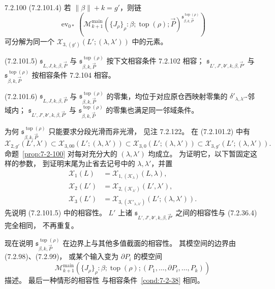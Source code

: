 \begin{proposition}{7.2.100}
\noindent\textup{(7.2.101.4)}\quad
若 $\|\beta\|+k=g'$，则链
\[
\operatorname{ev}_{0*}\left(
\mathcal M^{\mathrm{main}}_{k+1}
(\{J_\rho\}_\rho:\beta;
\operatorname{top}(\rho);\vec P)
^{\mathfrak s^{\operatorname{top}(\rho)}_{\beta,k,\vec P}}
\right)
\]
可分解为同一个
$\mathcal X_{3,(g')}(L';(\lambda,\lambda'))$
中的元素。

\noindent\textup{(7.2.101.5)}\quad
$\mathfrak s_{L,J,k,\beta,\vec P}$
与 $\mathfrak s^{\operatorname{top}(\rho)}_{\beta,k,\vec P}$
按下文相容条件 7.2.102 相容；
$\mathfrak s_{L',J',\mathfrak d',k,\beta,\vec P'}$
与 $\mathfrak s^{\operatorname{top}(\rho)}_{\beta,k,\vec P}$
按相容条件 7.2.104 相容。

\noindent\textup{(7.2.101.6)}\quad
$\mathfrak s_{L,J,k,\beta,\vec P}$ 与
$\mathfrak s^{\operatorname{top}(\rho)}_{\beta,k,\vec P}$
的零集，均位于对应原仓西映射零集的
$\delta'_{\lambda,\lambda'}$-邻域内；
$\mathfrak s_{L',J',\mathfrak d',k,\beta,\vec P'}$
与
$\mathfrak s^{\operatorname{top}(\rho)}_{\beta,k,\vec P}$
的零集也满足同一邻域条件。
\end{proposition}

为何 $\mathfrak s^{\operatorname{top}(\rho)}_{\beta,k,\vec P}$
只能要求分段光滑而非光滑，
见注 7.2.122。
在 (7.2.101.2) 中有
\[
\mathcal X_{2,g'}(L',\lambda')
\subset\mathcal X_{3,00}(L';(\lambda,\lambda'))
\subset\mathcal X_{3,0}(L';(\lambda,\lambda'))
\subset\mathcal X_{3,g'}(L';(\lambda,\lambda')).
\]
命题~\ref{prop:7-2-100}
对每对充分大的 $(\lambda,\lambda')$ 均成立。
为证明它，以下暂固定这样的参数，
到证明末尾为止省去记号中的 $\lambda,\lambda'$，并置
\[
\begin{aligned}
\mathcal X_1(L)
&=\mathcal X_{1,(\mathcal K_\lambda)}(L,\lambda),\\
\mathcal X_2(L')
&=\mathcal X_{2,(\mathcal K_{\lambda'})}(L',\lambda'),\\
\mathcal X_3(L')
&=\mathcal X_{3,(\mathcal K'_{\lambda,\lambda'})}
(L';(\lambda,\lambda')).
\end{aligned}
\]
先说明 (7.2.101.5) 中的相容性。
$L'$ 上诸
$\mathfrak s_{L',J',\mathfrak d',k,\beta,\vec P'}$
之间的相容性与 (7.2.36.4) 完全相同，
不再重复。

现在说明
$\mathfrak s^{\operatorname{top}(\rho)}_{\beta,k,\vec P}$
在边界上与其他多值截面的相容性。
其模空间的边界由 (7.2.98)、(7.2.99)，
或某个输入变为 $\partial P_i$ 的模空间
\[
\mathcal M^{\mathrm{main}}_{k+1}
(\{J_\rho\}_\rho:\beta;
\operatorname{top}(\rho);
(P_1,\ldots,\partial P_i,\ldots,P_k))
\]
描述。
最后一种情形的相容性
与相容条件~\ref{cond:7-2-38} 相同。

